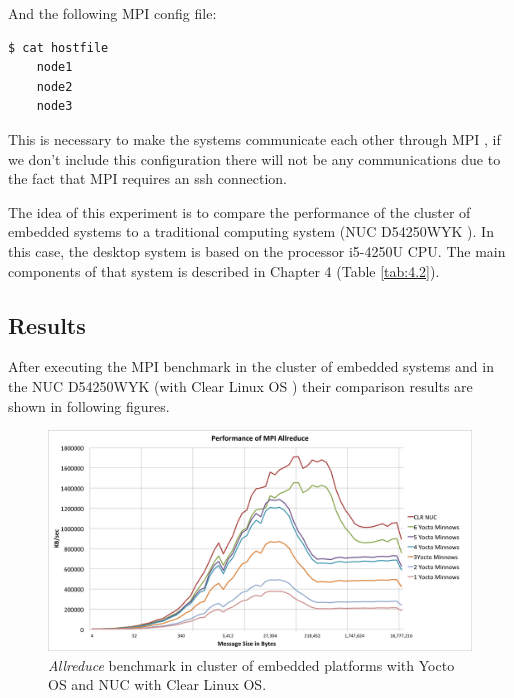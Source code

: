And the following MPI config file:

\begin{minipage}{\textwidth}
\end{minipage}

\begin{minipage}{\textwidth}
\begin{lstlisting}[frame=single]
  $ cat hostfile
    node1
    node2
    node3
\end{lstlisting}

\end{minipage}

This is necessary to make the systems communicate each other through MPI , if
we don't include this configuration there will not be any communications due to
the fact that MPI requires an ssh connection. 

The idea of this experiment is to compare the performance of the cluster of
embedded systems to a traditional computing system (NUC D54250WYK \cite{NUC}).
In this case, the desktop system is based on the processor i5-4250U CPU. The
main components of that system is described in Chapter 4 (Table \ref{tab:4.2}).

\subsection{Results}

After executing the MPI benchmark in the cluster of embedded systems  and in
the NUC D54250WYK \cite{NUC} (with Clear Linux OS \cite{clear-linux}) their
comparison results are shown in following figures. 


\begin{figure}
  \includegraphics[width=\paperwidth]{images/mpbench_cluster_experiments/mpi_all_reduce.png}
\caption{\textit{Allreduce} benchmark in cluster of embedded platforms with Yocto OS and NUC
with Clear Linux OS.}
\label{all_reduce_cluster}
\end{figure}

